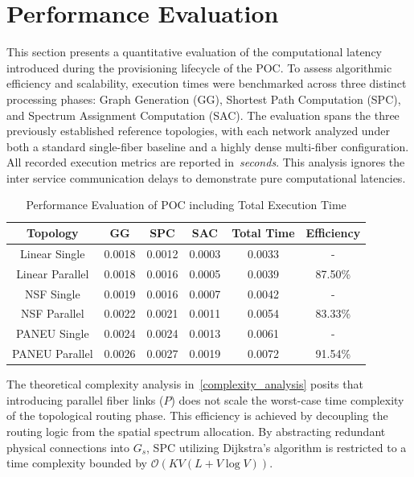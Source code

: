 \documentclass[12pt, a4paper, twoside, openright]{report}
\begin{document}
\section{Performance Evaluation}
This section presents a quantitative evaluation of the computational latency introduced during the provisioning lifecycle of the POC. To assess algorithmic efficiency and scalability, execution times were benchmarked across three distinct processing phases: Graph Generation (GG), Shortest Path Computation (SPC), and Spectrum Assignment Computation (SAC). The evaluation spans the three previously established reference topologies, with each network analyzed under both a standard single-fiber baseline and a highly dense multi-fiber configuration. All recorded execution metrics are reported in~\emph{seconds}. This analysis ignores the inter service communication delays to demonstrate pure computational latencies.
\begin{table}[htbp]
    \centering
    \begin{tabular}{|c|c|c|c|c|c|}
        \hline
        \textbf{Topology} & \textbf{GG} & \textbf{SPC} & \textbf{SAC} & \textbf{Total Time} & \textbf{Efficiency} \\
        \hline
        Linear Single     & 0.0018      & 0.0012       & 0.0003       & 0.0033              & -                   \\
        \hline
        Linear Parallel   & 0.0018      & 0.0016       & 0.0005       & 0.0039              & 87.50\%             \\
        \hline
        NSF Single        & 0.0019      & 0.0016       & 0.0007       & 0.0042              & -                   \\
        \hline
        NSF Parallel      & 0.0022      & 0.0021       & 0.0011       & 0.0054              & 83.33\%             \\
        \hline
        PANEU Single      & 0.0024      & 0.0024       & 0.0013       & 0.0061              & -                   \\
        \hline
        PANEU Parallel    & 0.0026      & 0.0027       & 0.0019       & 0.0072              & 91.54\%             \\
        \hline
    \end{tabular}
    \caption{Performance Evaluation of POC including Total Execution Time}
    \label{tab:complexity_analysis_table}
\end{table}
The theoretical complexity analysis in~\ref{complexity_analysis} posits that introducing parallel fiber links ($P$) does not scale the worst-case time complexity of the topological routing phase. This efficiency is achieved by decoupling the routing logic from the spatial spectrum allocation. By abstracting redundant physical connections into  $G_s$, SPC utilizing Dijkstra's algorithm is restricted to a time complexity bounded by $\mathcal{O}(KV(L+V\log V))$.
\end{document}
